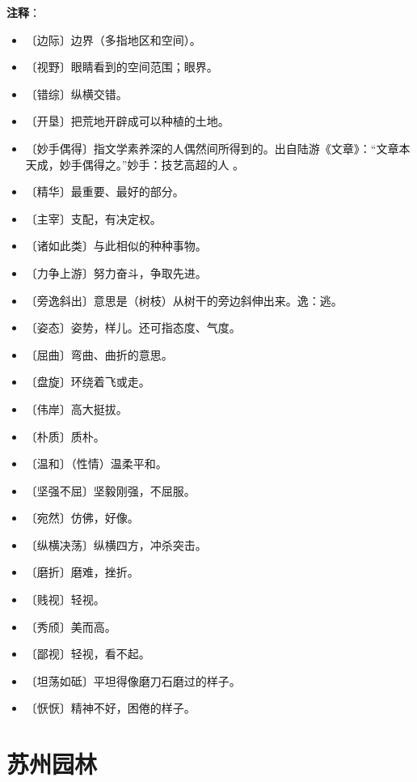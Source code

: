\documentclass[12pt,UTF-8,openany]{ctexbook}
\begin{document}
\newpage

\textbf{注释}：

\vspace{-1em}

\begin{itemize}
    \setlength\itemsep{-0.2em}
    \item 〔边际〕边界（多指地区和空间）。
    \item 〔视野〕眼睛看到的空间范围；眼界。
    \item 〔错综〕纵横交错。
    \item 〔开垦〕把荒地开辟成可以种植的土地。
    \item 〔妙手偶得〕指文学素养深的人偶然间所得到的。出自陆游《文章》：“文章本天成，妙手偶得之。”妙手：技艺高超的人 。
    \item 〔精华〕最重要、最好的部分。
    \item 〔主宰〕支配，有决定权。
    \item 〔诸如此类〕与此相似的种种事物。
    \item 〔力争上游〕努力奋斗，争取先进。
    \item 〔旁逸斜出〕意思是（树枝）从树干的旁边斜伸出来。逸：逃。
    \item 〔姿态〕姿势，样儿。还可指态度、气度。
    \item 〔屈曲〕弯曲、曲折的意思。
    \item 〔盘旋〕环绕着飞或走。
    \item 〔伟岸〕高大挺拔。
    \item 〔朴质〕质朴。
    \item 〔温和〕（性情）温柔平和。
    \item 〔坚强不屈〕坚毅刚强，不屈服。
    \item 〔宛然〕仿佛，好像。
    \item 〔纵横决荡〕纵横四方，冲杀突击。
    \item 〔磨折〕磨难，挫折。
    \item 〔贱视〕轻视。
    \item 〔秀颀〕美而高。
    \item 〔鄙视〕轻视，看不起。
    \item 〔坦荡如砥〕平坦得像磨刀石磨过的样子。
    \item 〔恹恹〕精神不好，困倦的样子。
\end{itemize}

\chapter{苏州园林}
\end{document}
